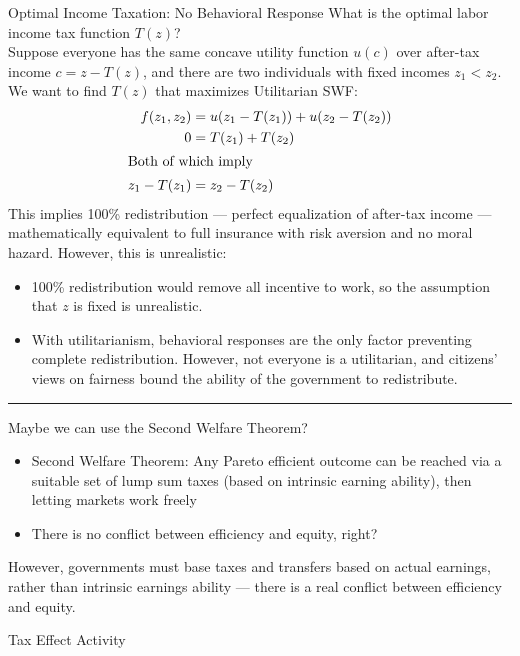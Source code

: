 \documentclass[10pt]{extarticle}
\begin{document}
  \begin{problem}{Optimal Income Taxation: No Behavioral Response}
    What is the optimal labor income tax function $T(z)$?\\

    Suppose everyone has the same concave utility function $u(c)$ over after-tax income $c = z - T(z)$, and there are two individuals with fixed incomes $z_1 < z_2$.\\

    We want to find $T(z)$ that maximizes Utilitarian SWF:
    \begin{align*}
      f(z_1,z_2) &= u(z_1-T(z_1)) + u(z_2 - T(z_2))\\
      0 &= T(z_1) + T(z_2)\\
      \shortintertext{Both of which imply}
      z_1 - T(z_1) &= z_2 - T(z_2)
    \end{align*}
    This implies 100\% redistribution --- perfect equalization of after-tax income --- mathematically equivalent to full insurance with risk aversion and no moral hazard. However, this is unrealistic:
    \begin{itemize}
      \item 100\% redistribution would remove all incentive to work, so the assumption that $z$ is fixed is unrealistic.
      \item With utilitarianism, behavioral responses are the only factor preventing complete redistribution. However, not everyone is a utilitarian, and citizens' views on fairness bound the ability of the government to redistribute.
    \end{itemize}
    \rule{\textwidth}{0.4pt}
    \vspace{4pt}
    Maybe we can use the Second Welfare Theorem?
    \begin{itemize}
      \item Second Welfare Theorem: Any Pareto efficient outcome can be reached via a suitable set of lump sum taxes (based on intrinsic earning ability), then letting markets work freely
      \item There is no conflict between efficiency and equity, right?
    \end{itemize}
    However, governments must base taxes and transfers based on actual earnings, rather than intrinsic earnings ability --- there is a real conflict between efficiency and equity.
  \end{problem}
  \begin{problem}{Tax Effect Activity}
    \begin{tcbraster}[raster columns = 2, sharp corners, colframe = black!75!white,colback=white]
    \end{tcbraster}
  \end{problem}
\end{document}
